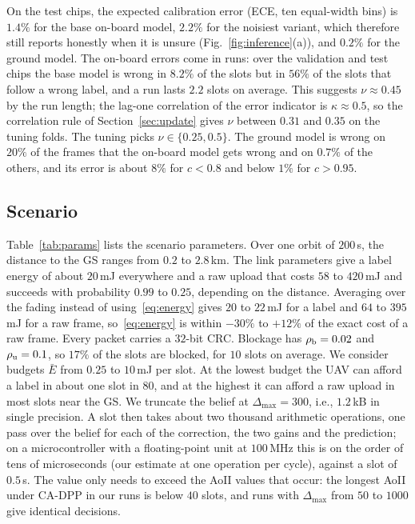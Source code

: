 \documentclass[5p,twocolumn]{elsarticle}
\theoremstyle{remark}
\begin{document}
On the test chips, the expected calibration error (ECE, ten equal-width bins) is $1.4\%$ for the base on-board model, $2.2\%$ for the noisiest variant, which therefore still reports honestly when it is unsure (Fig.~\ref{fig:inference}(a)), and $0.2\%$ for the ground model. The on-board errors come in runs: over the validation and test chips the base model is wrong in $8.2\%$ of the slots but in $56\%$ of the slots that follow a wrong label, and a run lasts $2.2$ slots on average. This suggests $\nu\approx0.45$ by the run length; the lag-one correlation of the error indicator is $\kappa\approx0.5$, so the correlation rule of Section~\ref{sec:update} gives $\nu$ between $0.31$ and $0.35$ on the tuning folds. The tuning picks $\nu\in\{0.25,0.5\}$. The ground model is wrong on $20\%$ of the frames that the on-board model gets wrong and on $0.7\%$ of the others, and its error is about $8\%$ for $c<0.8$ and below $1\%$ for $c>0.95$.

\subsection{Scenario}
Table~\ref{tab:params} lists the scenario parameters. Over one orbit of $200$\,s, the distance to the GS ranges from $0.2$ to $2.8$\,km. The link parameters give a label energy of about $20$\,mJ everywhere and a raw upload that costs $58$ to $420$\,mJ and succeeds with probability $0.99$ to $0.25$, depending on the distance. Averaging over the fading instead of using~\eqref{eq:energy} gives $20$ to $22$\,mJ for a label and $64$ to $395$\,mJ for a raw frame, so~\eqref{eq:energy} is within $-30\%$ to $+12\%$ of the exact cost of a raw frame. Every packet carries a $32$-bit CRC. Blockage has $\rho_{\rm b}=0.02$ and $\rho_{\rm u}=0.1$, so $17\%$ of the slots are blocked, for $10$ slots on average. We consider budgets $\bar E$ from $0.25$ to $10$\,mJ per slot. At the lowest budget the UAV can afford a label in about one slot in $80$, and at the highest it can afford a raw upload in most slots near the GS. We truncate the belief at $\Delta_{\max}=300$, i.e., $1.2$\,kB in single precision. A slot then takes about two thousand arithmetic operations, one pass over the belief for each of the correction, the two gains and the prediction; on a microcontroller with a floating-point unit at $100$\,MHz this is on the order of tens of microseconds (our estimate at one operation per cycle), against a slot of $0.5$\,s. The value only needs to exceed the AoII values that occur: the longest AoII under CA-DPP in our runs is below $40$ slots, and runs with $\Delta_{\max}$ from $50$ to $1000$ give identical decisions.
\end{document}
